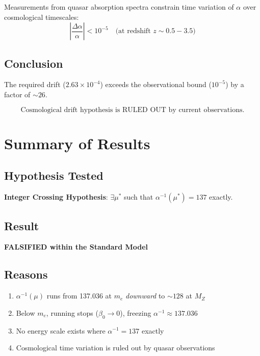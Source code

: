 \documentclass[11pt,a4paper]{article}
\begin{document}
Measurements from quasar absorption spectra constrain time variation of $\alpha$ over cosmological timescales:
\begin{equation}
\left|\frac{\Delta\alpha}{\alpha}\right| < 10^{-5} \quad \text{(at redshift } z \sim 0.5-3.5\text{)}
\end{equation}

\subsection{Conclusion}

The required drift ($2.63 \times 10^{-4}$) exceeds the observational bound ($10^{-5}$) by a factor of $\sim 26$.

\begin{equation}
\boxed{\text{Cosmological drift hypothesis is RULED OUT by current observations.}}
\end{equation}

\section{Summary of Results}

\subsection{Hypothesis Tested}

\textbf{Integer Crossing Hypothesis}: $\exists \mu^*$ such that $\alpha^{-1}(\mu^*) = 137$ exactly.

\subsection{Result}

\begin{center}
\textbf{FALSIFIED within the Standard Model}
\end{center}

\subsection{Reasons}

\begin{enumerate}
    \item $\alpha^{-1}(\mu)$ runs from 137.036 at $m_e$ \textit{downward} to $\sim 128$ at $M_Z$
    \item Below $m_e$, running stops ($\beta_0 \to 0$), freezing $\alpha^{-1} \approx 137.036$
    \item No energy scale exists where $\alpha^{-1} = 137$ exactly
    \item Cosmological time variation is ruled out by quasar observations
\end{enumerate}
\end{document}
